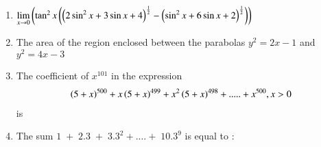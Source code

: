 \documentclass[journal,,12pt,onecolumn]{IEEEtran}
\theoremstyle{remark}
\begin{document}
\begin{enumerate}
 \item $\lim \limits_{x\to 0}\left(\tan^2{x}\left(\left(2\sin^2{x}+3\sin{x}+4\right)^{\frac{1}{2}}-\left(\sin^2{x}+6\sin{x}+2\right)^{\frac{1}{2}}\right)\right)$
 \begin{enumerate}
 \end{enumerate}
 \bigskip
 \item The area of the region enclosed between the parabolas $y^2=2x-1$ and $y^2=4x-3$
 \begin{enumerate}
 \end{enumerate}
\bigskip
 \item The coefficient of $x^{101}$ in the expression 
 \begin{align*}
     \left(5+x\right)^{500}+x\left(5+x\right)^{499}+x^2\left(5+x\right)^{498}+ ..... + x^{500}, x>0
 \end{align*}
 is
 \begin{enumerate}
 \end{enumerate}
 \bigskip
 \item The sum $1\;+\;2.3\;+\;3.3^{2}+....+\;10.3^{9}$ is equal to :
 \begin{enumerate}
\end{enumerate}
\end{enumerate}
\end{document}
